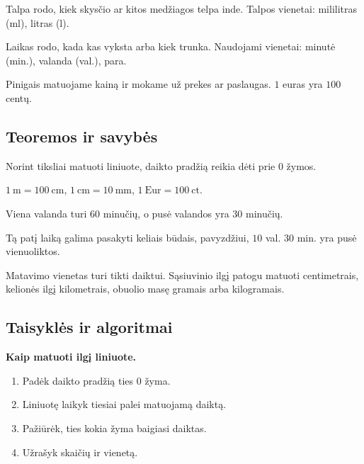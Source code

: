 \begin{apibreztis}
Talpa rodo, kiek skysčio ar kitos medžiagos telpa inde. Talpos vienetai: mililitras (ml), litras (l).
\end{apibreztis}

\begin{apibreztis}
Laikas rodo, kada kas vyksta arba kiek trunka. Naudojami vienetai: minutė (min.), valanda (val.), para.
\end{apibreztis}

\begin{apibreztis}
Pinigais matuojame kainą ir mokame už prekes ar paslaugas. \(1\) euras yra \(100\) centų.
\end{apibreztis}

\subsection{Teoremos ir savybės}

\begin{savybe}
Norint tiksliai matuoti liniuote, daikto pradžią reikia dėti prie \(0\) žymos.
\end{savybe}

\begin{savybe}
\(1\ \text{m}=100\ \text{cm}\), \(1\ \text{cm}=10\ \text{mm}\), \(1\ \text{Eur}=100\ \text{ct}\).
\end{savybe}

\begin{savybe}
Viena valanda turi \(60\) minučių, o pusė valandos yra \(30\) minučių.
\end{savybe}

\begin{savybe}
Tą patį laiką galima pasakyti keliais būdais, pavyzdžiui, \(10\) val. \(30\) min. yra pusė vienuoliktos.
\end{savybe}

\begin{pastaba}
Matavimo vienetas turi tikti daiktui. Sąsiuvinio ilgį patogu matuoti centimetrais, kelionės ilgį kilometrais, obuolio masę gramais arba kilogramais.
\end{pastaba}

\subsection{Taisyklės ir algoritmai}

\textbf{Kaip matuoti ilgį liniuote.}
\begin{enumerate}
\item Padėk daikto pradžią ties \(0\) žyma.
\item Liniuotę laikyk tiesiai palei matuojamą daiktą.
\item Pažiūrėk, ties kokia žyma baigiasi daiktas.
\item Užrašyk skaičių ir vienetą.
\end{enumerate}

